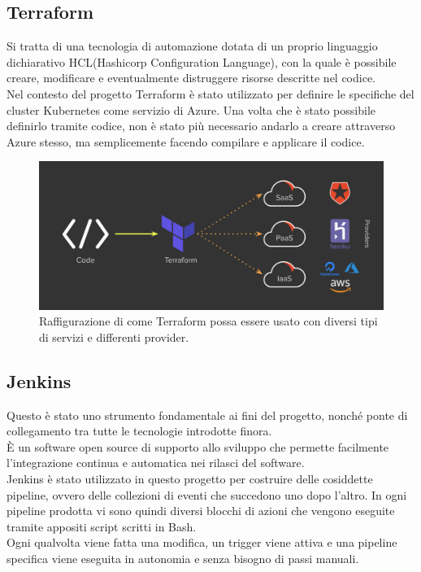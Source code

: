 \documentclass[a4paper,12pt]{report}
\begin{document}
\subsection{Terraform}
Si tratta di una tecnologia di automazione dotata di un proprio linguaggio dichiarativo HCL(Hashicorp Configuration Language), con la quale è possibile creare, modificare e eventualmente distruggere risorse descritte nel codice.\\
Nel contesto del progetto Terraform è stato utilizzato per definire le specifiche del cluster Kubernetes come servizio di Azure. Una volta che è stato possibile definirlo tramite codice, non è stato più necessario andarlo a creare attraverso Azure stesso, ma semplicemente facendo compilare e applicare il codice.

\begin{figure}[h]
	\includegraphics[width=1.0\textwidth]{terraform}
    \caption{Raffigurazione di come Terraform possa essere usato con diversi tipi di servizi e differenti provider. \cite{terraformimg}}
    \label{fig:terraform}
\end{figure}

\subsection{Jenkins}
Questo è stato uno strumento fondamentale ai fini del progetto, nonché ponte di collegamento tra tutte le tecnologie introdotte finora. \\
È un software open source di supporto allo sviluppo che permette facilmente l'integrazione continua e automatica nei rilasci del software.\cite{jenkins}\\
Jenkins è stato utilizzato in questo progetto per costruire delle cosiddette pipeline, ovvero delle collezioni di eventi che succedono uno dopo l'altro. 
In ogni pipeline prodotta vi sono quindi diversi blocchi di azioni che vengono eseguite tramite appositi script scritti in Bash. \\
Ogni qualvolta viene fatta una modifica, un trigger viene attiva e una pipeline specifica viene eseguita in autonomia e senza bisogno di passi manuali.
\end{document}
